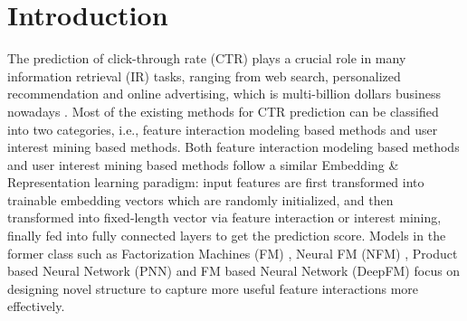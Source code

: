 

\section{Introduction}\label{introduction}
The prediction of click-through rate (CTR) plays a crucial role in many information retrieval (IR) tasks, ranging from web search, personalized recommendation and online advertising, which is multi-billion dollars business nowadays \cite{li2019multi}.
Most of the existing methods for CTR prediction can be classified into two categories, i.e., feature interaction modeling based methods and user interest mining based methods.
Both feature interaction modeling based methods and user interest mining based methods follow a similar Embedding \& Representation learning paradigm: input features are first transformed into trainable embedding vectors which are randomly initialized, and then transformed into fixed-length vector via feature interaction or interest mining, finally fed into fully connected layers to get the prediction score.
Models in the former class such as Factorization Machines (FM) \cite{rendle2010factorization}, Neural FM (NFM) \cite{he2017neural}, Product based Neural Network (PNN) \cite{qu2018product} and FM based Neural Network (DeepFM) \cite{guo2017deepfm} focus on designing novel structure to capture more useful feature interactions more effectively.

